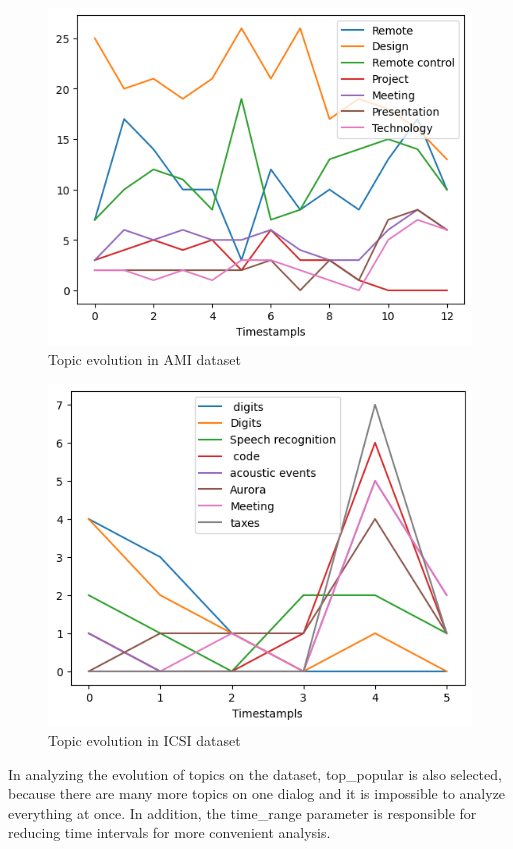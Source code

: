 \documentclass[PMI,VKR]{HSEUniversity}
\begin{document}
\begin{figure}[h]
    \centering
    \includegraphics[scale=0.7]{img/ami_topics_evol.png}
    \caption{Topic evolution in AMI dataset}
\end{figure}

\begin{figure}[h]
    \centering
    \includegraphics[scale=0.7]{img/topic_evol_icsi.png}
    \caption{Topic evolution in ICSI dataset}
\end{figure}

In analyzing the evolution of topics on the dataset, top\_popular is also selected, because there are many more topics on one dialog and it is impossible to analyze everything at once. 
In addition, the time\_range parameter is responsible for reducing time intervals for more convenient analysis.
\end{document}
